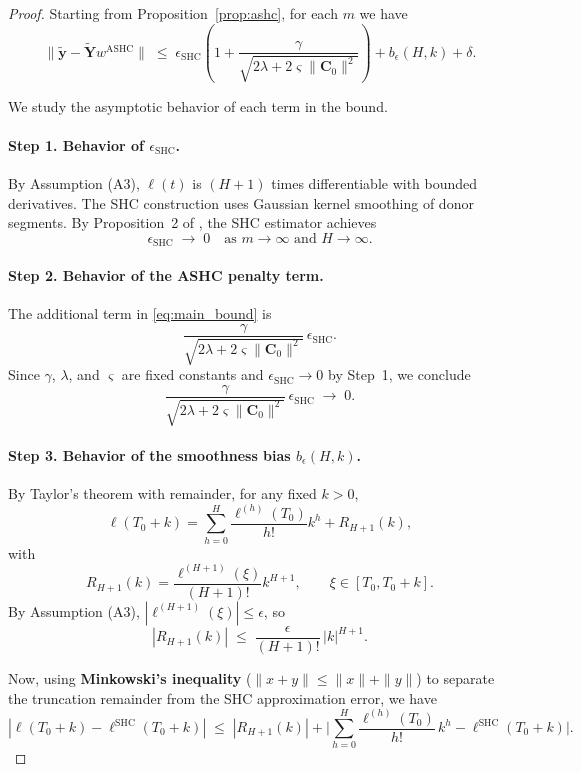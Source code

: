 \documentclass{article}
\begin{document}
\begin{proof}
Starting from Proposition~\ref{prop:ashc}, for each $m$ we have
\begin{equation}
\label{eq:main_bound}
\|\widetilde{\mathbf{y}} - \widetilde{\mathbf{Y}} w^{\text{ASHC}}\|
\;\leq\;
\epsilon_{\text{SHC}}
\left(1 + \frac{\gamma}{\sqrt{2\lambda + 2\varsigma \|\mathbf{C}_0\|^2}} \right)
+ b_\epsilon(H,k) + \delta.
\end{equation}

We study the asymptotic behavior of each term in the bound.

\paragraph{Step 1. Behavior of $\epsilon_{\text{SHC}}$.}
By Assumption (A3), $\ell(t)$ is $(H+1)$ times differentiable with bounded derivatives.
The SHC construction uses Gaussian kernel smoothing of donor segments.
By Proposition~2 of \cite{SHC}, the SHC estimator achieves
\[
\epsilon_{\text{SHC}} \;\longrightarrow\; 0
\quad\text{as } m \to \infty \text{ and } H \to \infty.
\]

\paragraph{Step 2. Behavior of the ASHC penalty term.}
The additional term in \eqref{eq:main_bound} is
\[
\frac{\gamma}{\sqrt{2\lambda + 2\varsigma \|\mathbf{C}_0\|^2}} \,\epsilon_{\text{SHC}}.
\]
Since $\gamma$, $\lambda$, and $\varsigma$ are fixed constants and $\epsilon_{\text{SHC}} \to 0$ by Step~1,
we conclude
\[
\frac{\gamma}{\sqrt{2\lambda + 2\varsigma \|\mathbf{C}_0\|^2}} \,\epsilon_{\text{SHC}} \;\longrightarrow\; 0.
\]

\paragraph{Step 3. Behavior of the smoothness bias $b_\epsilon(H,k)$.}
By Taylor's theorem with remainder, for any fixed $k > 0$,
\[
\ell(T_0 + k) 
= \sum_{h=0}^H \frac{\ell^{(h)}(T_0)}{h!}k^h
+ R_{H+1}(k),
\]
with 
\[
R_{H+1}(k) 
= \frac{\ell^{(H+1)}(\xi)}{(H+1)!} k^{H+1}, 
\qquad \xi \in [T_0, T_0+k].
\]
By Assumption (A3), $|\ell^{(H+1)}(\xi)| \leq \epsilon$, so
\[
|R_{H+1}(k)| \;\leq\; \frac{\epsilon}{(H+1)!}\,|k|^{H+1}.
\]

Now, using \textbf{Minkowski’s inequality} ($\|x+y\| \leq \|x\| + \|y\|$) to separate the
truncation remainder from the SHC approximation error, we have
\[
|\ell(T_0+k) - \ell^{\text{SHC}}(T_0+k)|
\;\leq\; |R_{H+1}(k)| 
+ \Big|\sum_{h=0}^H \frac{\ell^{(h)}(T_0)}{h!}\,k^h - \ell^{\text{SHC}}(T_0+k)\Big|.
\]


\end{proof}
\end{document}
